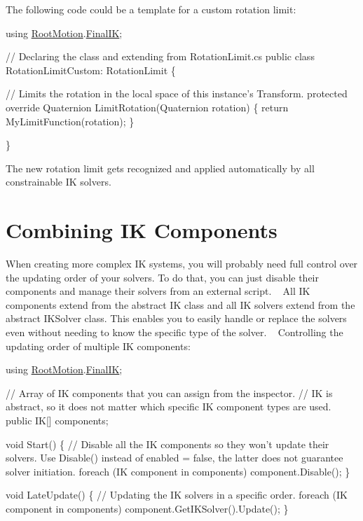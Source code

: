 The following code could be a template for a custom rotation limit\+:


\begin{DoxyCode}
\textcolor{keyword}{using} \mbox{\hyperlink{namespace_root_motion}{RootMotion}}.\mbox{\hyperlink{namespace_root_motion_1_1_final_i_k}{FinalIK}};

\textcolor{comment}{// Declaring the class and extending from RotationLimit.cs}
\textcolor{keyword}{public} \textcolor{keyword}{class }RotationLimitCustom: RotationLimit \{
    
    \textcolor{comment}{// Limits the rotation in the local space of this instance's Transform.}
    \textcolor{keyword}{protected} \textcolor{keyword}{override} Quaternion LimitRotation(Quaternion rotation) \{      
        \textcolor{keywordflow}{return} MyLimitFunction(rotation);
    \}

\}
\end{DoxyCode}
 The new rotation limit gets recognized and applied automatically by all constrainable IK solvers.\hypertarget{page13_combining}{}\section{Combining I\+K Components}\label{page13_combining}
When creating more complex IK systems, you will probably need full control over the updating order of your solvers. To do that, you can just disable their components and manage their solvers from an external script. ~\newline
All IK components extend from the abstract IK class and all IK solvers extend from the abstract I\+K\+Solver class. This enables you to easily handle or replace the solvers even without needing to know the specific type of the solver. ~\newline
Controlling the updating order of multiple IK components\+: 
\begin{DoxyCode}
\textcolor{keyword}{using} \mbox{\hyperlink{namespace_root_motion}{RootMotion}}.\mbox{\hyperlink{namespace_root_motion_1_1_final_i_k}{FinalIK}};

\textcolor{comment}{// Array of IK components that you can assign from the inspector. }
\textcolor{comment}{// IK is abstract, so it does not matter which specific IK component types are used.}
\textcolor{keyword}{public} IK[] components;
    
\textcolor{keywordtype}{void} Start() \{
    \textcolor{comment}{// Disable all the IK components so they won't update their solvers. Use Disable() instead of enabled =
       false, the latter does not guarantee solver initiation.}
    \textcolor{keywordflow}{foreach} (IK component \textcolor{keywordflow}{in} components) component.Disable();
\}

\textcolor{keywordtype}{void} LateUpdate() \{
    \textcolor{comment}{// Updating the IK solvers in a specific order. }
    \textcolor{keywordflow}{foreach} (IK component \textcolor{keywordflow}{in} components) component.GetIKSolver().Update();
\}
\end{DoxyCode}


